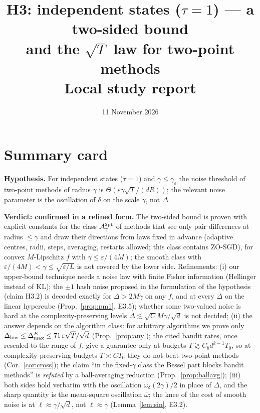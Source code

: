 \documentclass[11pt,a4paper]{article}
\title{\textbf{H3: independent states ($\tau=1$) --- a two-sided bound\\ and the $\sqrt T$ law for two-point methods}\\[2pt]
\large Local study report}
\author{}
\date{11 November 2026}
\numberwithin{equation}{section}
\theoremstyle{definition}
\theoremstyle{remark}
\newcommand{\Dmax}{\Delta_{\max}}\newcommand{\Dcp}{\Delta_{\rm cp}}\newcommand{\Dlow}{\Delta_{\rm low}}
\newcommand{\wbar}{\bar\omega}\newcommand{\Atwo}{\cA^{\rm 2pt}_\gamma}
\begin{document}
\maketitle
\tableofcontents

\setcounter{section}{-1}
\section{Summary card}\label{sec:card}
\begin{tcolorbox}[card,title={H3 in one page}]
\textbf{Hypothesis.} For independent states ($\tau=1$) and $\gamma\le\gamma_\varepsilon$ the noise threshold of two-point methods of radius $\gamma$ is $\Theta(\varepsilon\gamma\sqrt T/(dR))$; the relevant noise parameter is the oscillation of $\delta$ on the scale $\gamma$, not $\Delta$.

\textbf{Verdict: confirmed in a refined form.} The two-sided bound is proven with explicit constants for the class $\Atwo$ of methods that see only pair differences at radius $\le\gamma$ and draw their directions from laws fixed in advance (adaptive centres, radii, steps, averaging, restarts allowed; this class contains ZO-SGD), for convex $M$-Lipschitz $f$ with $\gamma\le\varepsilon/(4M)$; the smooth class with $\varepsilon/(4M)<\gamma\le\sqrt{\varepsilon/L}$ is not covered by the lower side. Refinements: (i) our upper-bound technique needs a noise law with finite Fisher information (Hellinger instead of KL); the $\pm1$ hash noise proposed in the formulation of the hypothesis (claim H3.2) is decoded exactly for $\Delta>2M\gamma$ on any $f$, and at every $\Delta$ on the linear hypercube (Prop.~\ref{prop:pm1}, E3.5); whether some two-valued noise is hard at the complexity-preserving levels $\Delta\lesssim\sqrt C M\gamma/\sqrt d$ is not decided; (ii) the answer depends on the algorithm class: for arbitrary algorithms we prove only $\Dlow\le\Dmax^E\le71\,\varepsilon\sqrt T/\sqrt d$ (Prop.~\ref{prop:any}); the cited bandit rates, once rescaled to the range of $f$, give a guarantee only at budgets $T\gtrsim C_bd^{k-1}T_0$, so at complexity-preserving budgets $T\asymp CT_0$ they do not beat two-point methods (Cor.~\ref{cor:cross}); the claim ``in the fixed-$\gamma$ class the Bessel part blocks bandit methods'' is \emph{refuted} by a ball-averaging reduction (Prop.~\ref{prop:ballavg}); (iii) both sides hold verbatim with the oscillation $\omega_\delta(2\gamma)/2$ in place of $\Delta$, and the sharp quantity is the mean-square oscillation $\wbar$; the knee of the cost of smooth noise is at $\ell\approx\gamma/\sqrt d$, not $\ell\approx\gamma$ (Lemma~\ref{lem:sin}, E3.2).


\end{tcolorbox}
\end{document}
